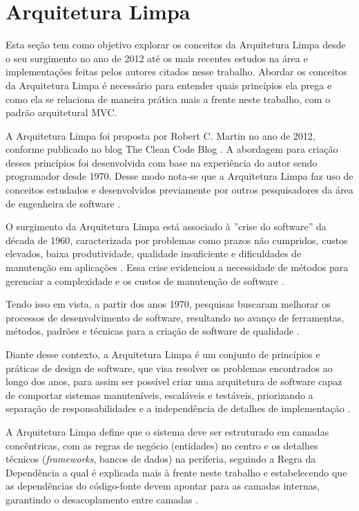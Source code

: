 \section{Arquitetura Limpa}

    \par Esta seção tem como objetivo explorar os conceitos da Arquitetura Limpa desde o seu surgimento no ano de 2012 até os mais recentes estudos na área e implementações feitas pelos autores citados nesse trabalho. Abordar os conceitos da Arquitetura Limpa é necessário para entender quais princípios ela prega e como ela se relaciona de maneira prática mais a frente neste trabalho, com o padrão arquitetural MVC.
    
    \par A Arquitetura Limpa foi proposta por Robert C. Martin no ano de 2012, conforme publicado no blog The Clean Code Blog \cite{artigo:ferreira:2022}. A abordagem para criação desses princípios foi desenvolvida com base na experiência do autor sendo programador desde 1970. Desse modo nota-se que a Arquitetura Limpa faz uso de conceitos estudados e desenvolvidos previamente por outros pesquisadores da área de engenheira de software \cite{livro:martin:cleanarch}.
    
    \par O surgimento da Arquitetura Limpa está associado à ''crise do software'' da década de 1960, caracterizada por problemas como prazos não cumpridos, custos elevados, baixa produtividade, qualidade insuficiente e dificuldades de manutenção em aplicações \cite{artigo:dantas:2021, artigo:ferreira:2022}. Essa crise evidenciou a necessidade de métodos para gerenciar a complexidade e os custos de manutenção de software \cite{livro:martin:cleanarch}.

    \par Tendo isso em vista, a partir dos anos 1970, pesquisas buscaram melhorar os processos de desenvolvimento de software, resultando no avanço de ferramentas, métodos, padrões e técnicas para a criação de software de qualidade \cite{artigo:dantas:2021}. 
    
    \par Diante desse contexto, a Arquitetura Limpa é um conjunto de princípios e práticas de design de software, que visa resolver os problemas encontrados ao longo dos anos, para assim ser possível criar uma arquitetura de software capaz de comportar sistemas manuteníveis, escaláveis e testáveis, priorizando a separação de responsabilidades e a independência de detalhes de implementação \cite{livro:martin:cleanarch}.

    \par A Arquitetura Limpa define que o sistema deve ser estruturado em camadas concêntricas, com as regras de negócio (entidades) no centro e os detalhes técnicos (\textit{frameworks}, bancos de dados) na periferia, seguindo a Regra da Dependência a qual é explicada mais à frente neste trabalho e estabelecendo que as dependências do código-fonte devem apontar para as camadas internas, garantindo o desacoplamento entre camadas \cite{livro:martin:cleanarch}.